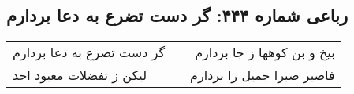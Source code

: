 \begin{center}
\section*{رباعی شماره ۴۴۴: گر دست تضرع به دعا بردارم}
\label{sec:sh444}
\begin{longtable}{l p{0.5cm} r}
گر دست تضرع به دعا بردارم
&&
بیخ و بن کوهها ز جا بردارم
\\
لیکن ز تفضلات معبود احد
&&
فاصبر صبرا جمیل را بردارم
\\
\end{longtable}
\end{center}
